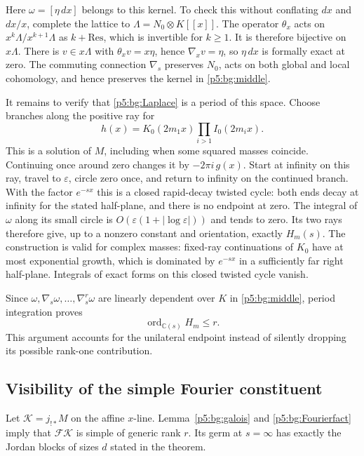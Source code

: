 \documentclass[11pt,a4paper]{article}
\theoremstyle{definition}
\theoremstyle{remark}
\numberwithin{equation}{section}
\begin{document}
Here $\omega=[\eta\,dx]$ belongs to this kernel.  To check this
without conflating $dx$ and $dx/x$, complete the lattice to
$\Lambda=N_0\otimes K[[x]]$.  The operator $\theta_x$ acts on
$x^k\Lambda/x^{k+1}\Lambda$ as $k+\mathrm{Res}$, which is
invertible for $k\ge1$.  It is therefore bijective on $x\Lambda$.
There is $v\in x\Lambda$ with $\theta_xv=x\eta$, hence
$\nabla_xv=\eta$, so $\eta\,dx$ is formally exact at zero.
The commuting connection $\nabla_s$ preserves $N_0$, acts on
both global and local cohomology, and hence preserves the kernel
in \eqref{p5:bg:middle}.

It remains to verify that \eqref{p5:bg:Laplace} is a period of this
space.  Choose branches along the positive ray for
\[
 h(x)=K_0(2m_1x)\prod_{i>1}I_0(2m_ix).
\]
This is a solution of $M$, including when some squared masses
coincide.  Continuing once around zero changes it by
$-2\pi i\,g(x)$.  Start at infinity on this ray, travel to
$\varepsilon$, circle zero once, and return to infinity on the
continued branch.  With the factor $e^{-sx}$ this is a closed
rapid-decay twisted cycle: both ends decay at infinity for the
stated half-plane, and there is no endpoint at zero.  The integral
of $\omega$ along its small circle is
$O(\varepsilon(1+|\log\varepsilon|))$ and tends to zero.
Its two rays therefore give, up to a nonzero constant and orientation,
exactly $H_m(s)$.  The construction is valid for complex masses:
fixed-ray continuations of $K_0$ have at most exponential growth,
which is dominated by $e^{-sx}$ in a sufficiently far right half-plane.
Integrals of exact forms on this closed twisted cycle vanish.

Since $\omega,\nabla_s\omega,\ldots,\nabla_s^r\omega$ are
linearly dependent over $K$ in \eqref{p5:bg:middle}, period integration
proves
\begin{equation}\label{p5:bg:upper}
                         \operatorname{ord}_{\mathbb C(s)}H_m\le r.
\end{equation}
This argument accounts for the unilateral endpoint instead of
silently dropping its possible rank-one contribution.

\subsection{Visibility of the simple Fourier constituent}

Let $\mathcal K=j_{!*}M$ on the affine $x$-line.  Lemma~\ref{p5:bg:galois}
and \eqref{p5:bg:Fourierfact} imply that $\mathcal F\mathcal K$ is
simple of generic rank $r$.  Its germ at $s=\infty$ has exactly
the Jordan blocks of sizes $d$ stated in the theorem.
\end{document}
